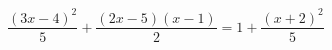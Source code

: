 \begin{ex}
	\begin{condition}
		\( \dfrac{(3x-4)^2}{5}+\dfrac{(2x-5)(x-1)}{2}=1+\dfrac{(x+2)^2}{5} \)
	\end{condition}
\end{ex}